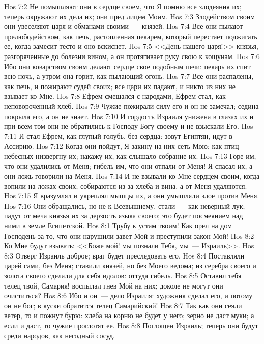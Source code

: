 \vs Hos 7:2 Не помышляют они в сердце своем, что Я помню все злодеяния их; теперь окружают их дела их; они пред лицем Моим.
\vs Hos 7:3 Злодейством своим они увеселяют царя и обманами своими~--- князей.
\vs Hos 7:4 Все они пылают прелюбодейством, как печь, растопленная пекарем, который перестает поджигать ее, когда замесит тесто и оно вскиснет.
\vs Hos 7:5 <<День нашего царя!>>  князья, разгоряченные до болезни вином, а он протягивает руку свою к кощунам.
\vs Hos 7:6 Ибо они коварством своим делают сердце свое подобным печи: пекарь их спит всю ночь, а утром она горит, как пылающий огонь.
\vs Hos 7:7 Все они распалены, как печь, и пожирают судей своих; все цари их падают, и никто из них не взывает ко Мне.
\vs Hos 7:8 Ефрем смешался с народами, Ефрем стал, как неповороченный хлеб.
\vs Hos 7:9 Чужие пожирали силу его и он не замечал; седина покрыла его, а он не знает.
\vs Hos 7:10 И гордость Израиля унижена в глазах их и при всем том они не обратились к Господу Богу своему и не взыскали Его.
\vs Hos 7:11 И стал Ефрем, как глупый голубь, без сердца: зовут Египтян, идут в Ассирию.
\vs Hos 7:12 Когда они пойдут, Я закину на них сеть Мою; как птиц небесных низвергну их; накажу их, как слышало собрание их.
\vs Hos 7:13 Горе им, что они удалились от Меня; гибель им, что они отпали от Меня! Я спасал их, а они ложь говорили на Меня.
\vs Hos 7:14 И не взывали ко Мне сердцем своим, когда вопили на ложах своих; собираются из-за хлеба и вина, а от Меня удаляются.
\vs Hos 7:15 Я вразумлял  и укреплял мышцы их, а они умышляли злое против Меня.
\vs Hos 7:16 Они обращались, но не к Всевышнему, стали~--- как неверный лук; падут от меча князья их за дерзость языка своего; это будет посмеянием над ними в земле Египетской.
\vs Hos 8:1 Трубу к устам твоим! Как орел  на дом Господень за то, что они нарушили завет Мой и преступили закон Мой!
\vs Hos 8:2 Ко Мне будут взывать: <<Боже мой! мы познали Тебя, мы~--- Израиль>>.
\vs Hos 8:3 Отверг Израиль доброе; враг будет преследовать его.
\vs Hos 8:4 Поставляли царей сами, без Меня; ставили князей, но без Моего ведома; из серебра своего и золота своего сделали для себя идолов: оттуда гибель.
\vs Hos 8:5 Оставил тебя телец твой, Самария! воспылал гнев Мой на них; доколе не могут они очиститься?
\vs Hos 8:6 Ибо и он~--- дело Израиля: художник сделал его, и потому он не бог; в куски обратится телец Самарийский!
\vs Hos 8:7 Так как они сеяли ветер, то и пожнут бурю: хлеба на корню не будет у него; зерно не даст муки; а если и даст, то чужие проглотят ее.
\vs Hos 8:8 Поглощен Израиль; теперь они будут среди народов, как негодный сосуд.
